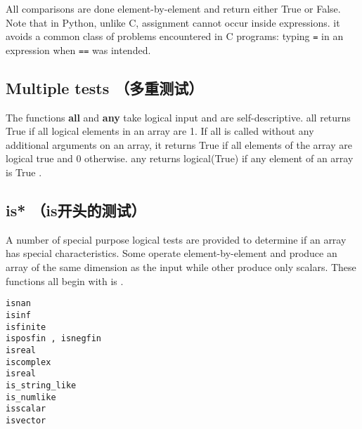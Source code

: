 \documentclass{article}
\begin{document}
All comparisons are done element-by-element and return either True or
False. Note that in Python, unlike C, assignment cannot occur inside
expressions. it avoids a common class of problems encountered in C
programs: typing \texttt{=} in an expression when \texttt{==} was
intended.

    \subsection{Multiple tests
（多重测试）}\label{multiple-tests-ux591aux91cdux6d4bux8bd5}

The functions \textbf{all} and \textbf{any} take logical input and are
self-descriptive. all returns True if all logical elements in an array
are 1. If all is called without any additional arguments on an array, it
returns True if all elements of the array are logical true and 0
otherwise. any returns logical(True) if any element of an array is True
.

    \subsection{is*
（is开头的测试）}\label{is-isux5f00ux5934ux7684ux6d4bux8bd5}

A number of special purpose logical tests are provided to determine if
an array has special characteristics. Some operate element-by-element
and produce an array of the same dimension as the input while other
produce only scalars. These functions all begin with is .

\begin{verbatim}
isnan
isinf
isfinite
isposfin , isnegfin
isreal
iscomplex
isreal
is_string_like
is_numlike
isscalar
isvector
\end{verbatim}


    
    
    
    
\end{document}
